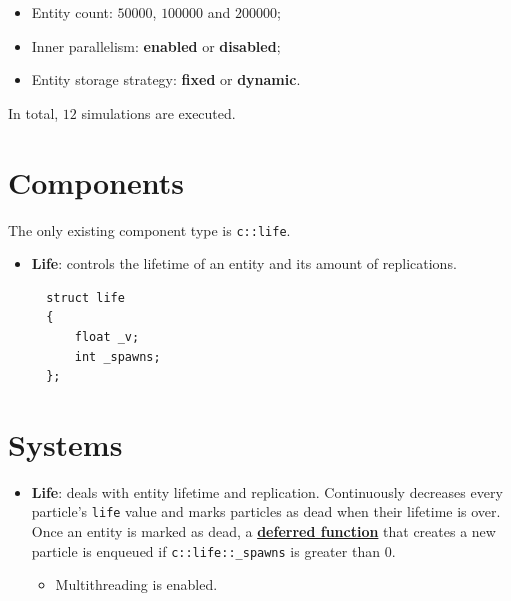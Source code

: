 \documentclass[oneside, 12pt, a4paper, openany]{book}
\providecommand{\tightlist}{%
  \setlength{\itemsep}{0pt}\setlength{\parskip}{0pt}}
\begin{document}
\begin{itemize}
\item
  Entity count: \(50000\), \(100000\) and \(200000\);
\item
  Inner parallelism: \textbf{enabled} or \textbf{disabled};
\item
  Entity storage strategy: \textbf{fixed} or \textbf{dynamic}.
\end{itemize}

In total, \(12\) simulations are executed.

\section{Components}\label{components-1}

The only existing component type is
\texttt{c::life}.

\begin{itemize}
\item
  \textbf{Life}: controls the lifetime of an entity and its amount of
  replications.

  \begin{verbatim}
  struct life
  {
      float _v;
      int _spawns;
  };
  \end{verbatim}
\end{itemize}

\section{Systems}\label{systems-1}

\begin{itemize}
\item
  \textbf{Life}: deals with entity lifetime and replication.
  Continuously decreases every particle's
  \texttt{life}
  value and marks particles as dead when their lifetime is over. Once an
  entity is marked as dead, a
  \protect\hyperlink{flow_exec_dfuncs}{\textbf{deferred function}} that
  creates a new particle is enqueued if
  \texttt{c::life::_spawns}
  is greater than \(0\).

  \begin{itemize}
  \tightlist
  \item
    Multithreading is enabled.
  \end{itemize}
\end{itemize}
\end{document}
